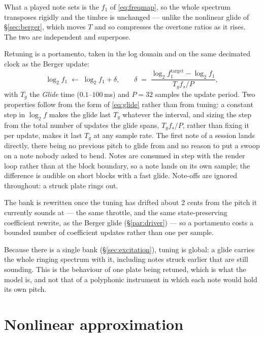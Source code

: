 \documentclass[11pt,a4paper]{article}
\begin{document}
What a played note sets is the $f_1$ of \eqref{eq:freqmap}, so the whole
spectrum transposes rigidly and the timbre is unchanged --- unlike the
nonlinear glide of \S\ref{sec:berger}, which moves $T$ and so compresses
the overtone ratios as it rises. The two are independent and superpose.

Retuning is a portamento, taken in the log domain and on the same
decimated clock as the Berger update:
%
\begin{equation}
  \log_2 f_1 \;\leftarrow\; \log_2 f_1 + \delta ,
  \qquad
  \delta \;=\; \frac{\log_2 f_1^{\mathrm{target}} - \log_2 f_1}
                    {T_g f_s / P} ,
  \label{eq:glide}
\end{equation}
%
with $T_g$ the \emph{Glide} time ($0.1$--$100$\,ms) and $P = 32$ samples
the update period. Two properties follow from the form of \eqref{eq:glide}
rather than from tuning: a constant step in $\log_2 f$ makes the glide last
$T_g$ whatever the interval, and sizing the step from the total number of
updates the glide spans, $T_g f_s / P$, rather than fixing it per update,
makes it last $T_g$ at any sample rate. The first note of a session lands
directly, there being no previous pitch to glide from and no reason to put
a swoop on a note nobody asked to bend. Notes are consumed in step with the
render loop rather than at the block boundary, so a note lands on its own
sample; the difference is audible on short blocks with a fast glide.
Note-offs are ignored throughout: a struck plate rings out.

The bank is rewritten once the tuning has drifted about 2 cents from the
pitch it currently sounds at --- the same throttle, and the same
state-preserving coefficient rewrite, as the Berger glide
(\S\ref{par:driver}) --- so a portamento costs a bounded number of
coefficient updates rather than one per sample.

Because there is a single bank (\S\ref{sec:excitation}), tuning is global:
a glide carries the whole ringing spectrum with it, including notes struck
earlier that are still sounding. This is the behaviour of one plate being
retuned, which is what the model is, and not that of a polyphonic
instrument in which each note would hold its own pitch.

\section{Nonlinear approximation}
\label{sec:nonlinear}
\end{document}
